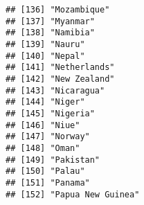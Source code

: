 \documentclass[
]{article}
\begin{document}
\begin{verbatim}
## [136] "Mozambique"                                                                                                                                           
## [137] "Myanmar"                                                                                                                                              
## [138] "Namibia"                                                                                                                                              
## [139] "Nauru"                                                                                                                                                
## [140] "Nepal"                                                                                                                                                
## [141] "Netherlands"                                                                                                                                          
## [142] "New Zealand"                                                                                                                                          
## [143] "Nicaragua"                                                                                                                                            
## [144] "Niger"                                                                                                                                                
## [145] "Nigeria"                                                                                                                                              
## [146] "Niue"                                                                                                                                                 
## [147] "Norway"                                                                                                                                               
## [148] "Oman"                                                                                                                                                 
## [149] "Pakistan"                                                                                                                                             
## [150] "Palau"                                                                                                                                                
## [151] "Panama"                                                                                                                                               
## [152] "Papua New Guinea"                                                                                                                                     

\end{verbatim}
\end{document}
